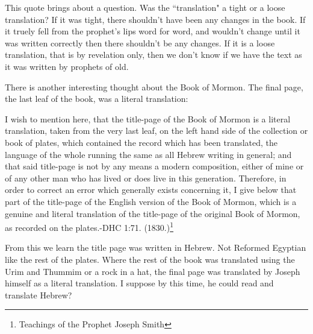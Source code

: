 This quote brings about a question. Was the ``translation" a tight or a loose
translation? If it was tight, there shouldn't have been any changes in the book. If
it truely fell from the prophet's lips word for word, and wouldn't change until it
was written correctly then there shouldn't be any changes. If it is a loose
translation, that is by revelation only, then we don't know if we have the text as it
was written by prophets of old.

There is another interesting thought about the Book of Mormon. The final page, the
last leaf of the book, was a literal translation:

\begin{displayquote}
I wish to mention here, that the title-page of the Book of Mormon is a literal 
translation, taken from the very last leaf, on the left hand side of the collection 
or book of plates, which contained the record which has been translated, the language 
of the whole running the same as all Hebrew writing in general; and that said 
title-page is not by any means a modern composition, either of mine or of any other 
man who has lived or does live in this generation. Therefore, in order to correct an 
error which generally exists concerning it, I give below that part of the title-page 
of the English version of the Book of Mormon, which is a genuine and literal 
translation of the title-page of the original Book of Mormon, as recorded on the 
plates.-DHC 1:71. (1830.)\footnote{Teachings of the Prophet Joseph Smith}
\end{displayquote}

From this we learn the title page was written in Hebrew. Not Reformed Egyptian like
the rest of the plates. Where the rest of the book was translated using the Urim and
Thummim or a rock in a hat, the final page was translated by Joseph himself as a
literal translation. I suppose by this time, he could read and translate Hebrew?